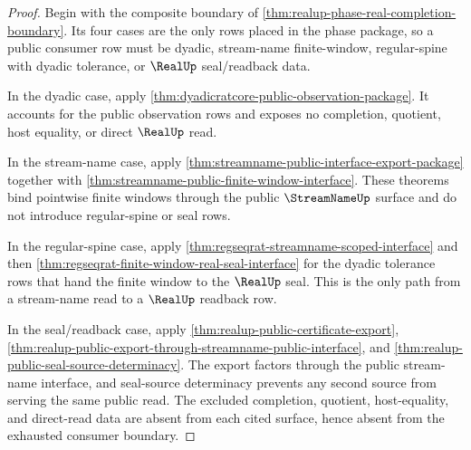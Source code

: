 \begin{proof}
Begin with the composite boundary of
\autoref{thm:realup-phase-real-completion-boundary}. Its four cases are the
only rows placed in the phase package, so a public consumer row must be
dyadic, stream-name finite-window, regular-spine with dyadic tolerance, or
$\RealUp$ seal/readback data.

In the dyadic case, apply
\autoref{thm:dyadicratcore-public-observation-package}. It accounts for the
public observation rows and exposes no completion, quotient, host equality, or
direct $\RealUp$ read.

In the stream-name case, apply
\autoref{thm:streamname-public-interface-export-package} together with
\autoref{thm:streamname-public-finite-window-interface}. These theorems bind
pointwise finite windows through the public $\StreamNameUp$ surface and do not
introduce regular-spine or seal rows.

In the regular-spine case, apply
\autoref{thm:regseqrat-streamname-scoped-interface} and then
\autoref{thm:regseqrat-finite-window-real-seal-interface} for the dyadic
tolerance rows that hand the finite window to the $\RealUp$ seal. This is the
only path from a stream-name read to a $\RealUp$ readback row.

In the seal/readback case, apply
\autoref{thm:realup-public-certificate-export},
\autoref{thm:realup-public-export-through-streamname-public-interface}, and
\autoref{thm:realup-public-seal-source-determinacy}. The export factors
through the public stream-name interface, and seal-source determinacy prevents
any second source from serving the same public read. The excluded completion,
quotient, host-equality, and direct-read data are absent from each cited
surface, hence absent from the exhausted consumer boundary.
\end{proof}

